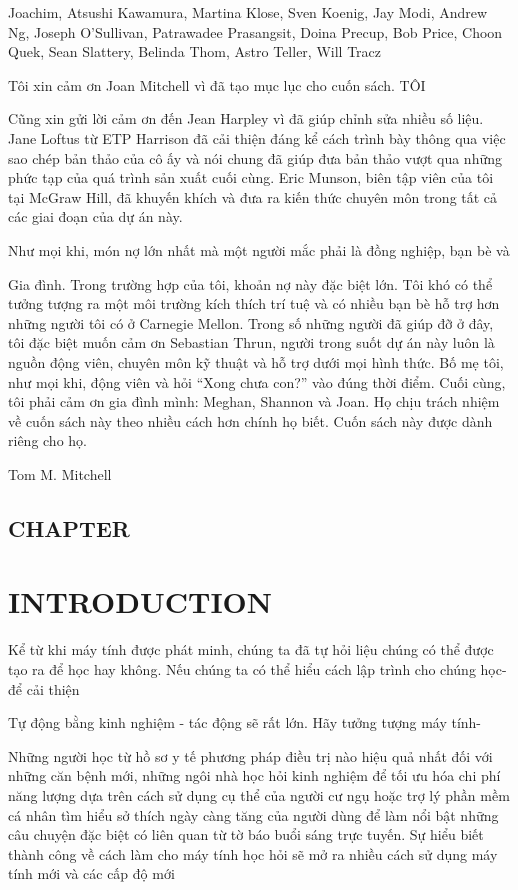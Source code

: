Joachim, Atsushi Kawamura, Martina Klose, Sven Koenig, Jay Modi, Andrew Ng, Joseph O'Sullivan, Patrawadee Prasangsit, Doina Precup, Bob Price, Choon Quek, Sean Slattery, Belinda Thom, Astro Teller, Will Tracz

Tôi xin cảm ơn Joan Mitchell vì đã tạo mục lục cho cuốn sách. TÔI

Cũng xin gửi lời cảm ơn đến Jean Harpley vì đã giúp chỉnh sửa nhiều số liệu. Jane Loftus từ ETP Harrison đã cải thiện đáng kể cách trình bày thông qua việc sao chép bản thảo của cô ấy và nói chung đã giúp đưa bản thảo vượt qua những phức tạp của quá trình sản xuất cuối cùng. Eric Munson, biên tập viên của tôi tại McGraw Hill, đã khuyến khích và đưa ra kiến ​​thức chuyên môn trong tất cả các giai đoạn của dự án này.

Như mọi khi, món nợ lớn nhất mà một người mắc phải là đồng nghiệp, bạn bè và

Gia đình. Trong trường hợp của tôi, khoản nợ này đặc biệt lớn. Tôi khó có thể tưởng tượng ra một môi trường kích thích trí tuệ và có nhiều bạn bè hỗ trợ hơn những người tôi có ở Carnegie Mellon. Trong số những người đã giúp đỡ ở đây, tôi đặc biệt muốn cảm ơn Sebastian Thrun, người trong suốt dự án này luôn là nguồn động viên, chuyên môn kỹ thuật và hỗ trợ dưới mọi hình thức. Bố mẹ tôi, như mọi khi, động viên và hỏi “Xong chưa con?” vào đúng thời điểm. Cuối cùng, tôi phải cảm ơn gia đình mình: Meghan, Shannon và Joan. Họ chịu trách nhiệm về cuốn sách này theo nhiều cách hơn chính họ biết. Cuốn sách này được dành riêng cho họ.

Tom M. Mitchell

\subsection{CHAPTER}

\section{INTRODUCTION}

Kể từ khi máy tính được phát minh, chúng ta đã tự hỏi liệu chúng có thể được tạo ra để học hay không. Nếu chúng ta có thể hiểu cách lập trình cho chúng học-để cải thiện

Tự động bằng kinh nghiệm - tác động sẽ rất lớn. Hãy tưởng tượng máy tính-

Những người học từ hồ sơ y tế phương pháp điều trị nào hiệu quả nhất đối với những căn bệnh mới, những ngôi nhà học hỏi kinh nghiệm để tối ưu hóa chi phí năng lượng dựa trên cách sử dụng cụ thể của người cư ngụ hoặc trợ lý phần mềm cá nhân tìm hiểu sở thích ngày càng tăng của người dùng để làm nổi bật những câu chuyện đặc biệt có liên quan từ tờ báo buổi sáng trực tuyến. Sự hiểu biết thành công về cách làm cho máy tính học hỏi sẽ mở ra nhiều cách sử dụng máy tính mới và các cấp độ mới

